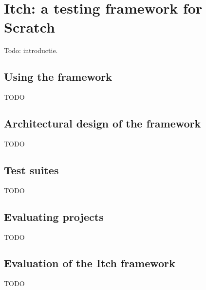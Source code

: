 \documentclass[../main]{subfiles}
\begin{document}
\chapter{Itch: a testing framework for Scratch}\label{ch:itch}

Todo: introductie.

\section{Using the framework}\label{sec:itch-using-the-framework}

TODO

\section{Architectural design of the framework}\label{sec:itch-architecture}

TODO

\section{Test suites}\label{sec:itch-test-suites}

TODO

\section{Evaluating projects}\label{sec:itch-evaluating-projects}

TODO

\section{Evaluation of the Itch framework}\label{sec:itch-evaluation}

TODO
\end{document}
